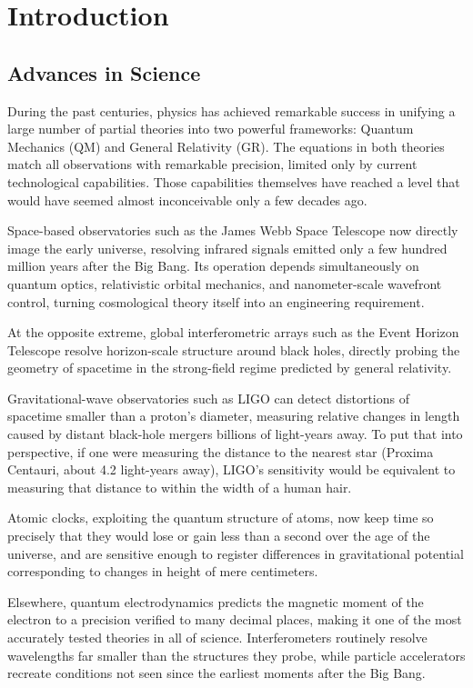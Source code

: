 \chapter{Introduction}
\label{chap:introduction}

\section{Advances in Science}

During the past centuries, physics has achieved remarkable success in unifying a large number of partial theories into two powerful frameworks: Quantum Mechanics (QM) and General Relativity (GR). The equations in both theories match all observations with remarkable precision, limited only by current technological capabilities. Those capabilities themselves have reached a level that would have seemed almost inconceivable only a few decades ago.

Space-based observatories such as the James Webb Space Telescope now directly image the early universe,
resolving infrared signals emitted only a few hundred million years after the Big Bang. Its operation
depends simultaneously on quantum optics, relativistic orbital mechanics, and nanometer-scale wavefront
control, turning cosmological theory itself into an engineering requirement.

At the opposite extreme, global interferometric arrays such as the Event Horizon Telescope resolve
horizon-scale structure around black holes, directly probing the geometry of spacetime in the
strong-field regime predicted by general relativity.

Gravitational-wave observatories such as LIGO can detect distortions of spacetime smaller than a proton’s diameter, measuring relative changes in length caused by distant black-hole mergers billions of light-years away. To put that into perspective, if one were measuring the distance to the nearest star (Proxima Centauri, about 4.2 light-years away), LIGO’s sensitivity would be equivalent to measuring that distance to within the width of a human hair.

Atomic clocks, exploiting the quantum structure of atoms, now keep time so precisely that they would lose or gain less than a second over the age of the universe, and are sensitive enough to register differences in gravitational potential corresponding to changes in height of mere centimeters.

Elsewhere, quantum electrodynamics predicts the magnetic moment of the electron to a precision verified to many decimal places, making it one of the most accurately tested theories in all of science. Interferometers routinely resolve wavelengths far smaller than the structures they probe, while particle accelerators recreate conditions not seen since the earliest moments after the Big Bang. 

